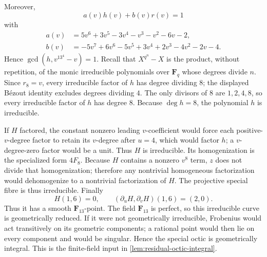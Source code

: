 \documentclass[10pt]{amsart}
\numberwithin{equation}{section}
\theoremstyle{definition}
\theoremstyle{remark}
\begin{document}
Moreover,
\[
 a(v)h(v)+b(v)r(v)=1
\]
with
\begin{align*}
a(v)&=5v^6+3v^5-3v^4-v^3-v^2-6v-2,\\
b(v)&=-5v^7+6v^6-5v^5+3v^4+2v^3-4v^2-2v-4.
\end{align*}
Hence $\gcd(h,v^{13^4}-v)=1$.  Recall that
$X^{q^n}-X$ is the product, without repetition, of the monic irreducible
polynomials over $\mathbf F_q$ whose degrees divide $n$.  Since $r_8=v$,
every irreducible factor of $h$ has degree dividing $8$; the displayed
B\'ezout identity excludes degrees dividing $4$.  The only divisors of $8$
are $1,2,4,8$, so every irreducible factor of $h$ has degree $8$.  Because
$\deg h=8$, the polynomial $h$ is irreducible.

If $H$ factored, the constant nonzero leading $v$-coefficient would force
each positive-$v$-degree factor to retain its $v$-degree after $u=4$, which
would factor $h$; a $v$-degree-zero factor would be a unit.  Thus $H$ is
irreducible.  Its homogenization is the specialized form $4F_8$.  Because
$H$ contains a nonzero $v^8$ term, $z$ does not divide that homogenization;
therefore any nontrivial homogeneous factorization would dehomogenize to a
nontrivial factorization of $H$.  The projective special fibre is thus
irreducible.  Finally
\[
 H(1,6)=0,
 \qquad
 (\partial_uH,\partial_vH)(1,6)=(2,0).
\]
Thus it has a smooth $\mathbf F_{13}$-point.  The field $\mathbf F_{13}$ is
perfect, so this irreducible curve is geometrically reduced.  If it were not
geometrically irreducible, Frobenius would act transitively on its geometric
components; a rational point would then lie on every component and would be
singular.  Hence the special octic is geometrically integral.  This is the
finite-field input in \cref{lem:residual-octic-integral}.
\end{document}
